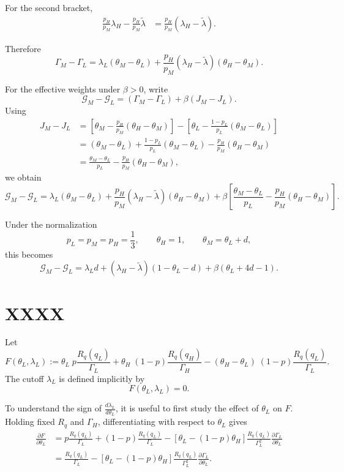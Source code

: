 \documentclass[11pt]{article}
\begin{document}
For the second bracket,
\begin{align*}
\frac{p_H}{p_M}\lambda_H-\frac{p_H}{p_M}\tilde\lambda
&=
\frac{p_H}{p_M}\left(\lambda_H-\tilde\lambda\right).
\end{align*}

Therefore
\[
\Gamma_M-\Gamma_L
=
\lambda_L\left(\theta_M-\theta_L\right)
+
\frac{p_H}{p_M}\left(\lambda_H-\tilde\lambda\right)\left(\theta_H-\theta_M\right).
\]

For the effective weights under \(\beta>0\), write
\[
\mathcal G_M-\mathcal G_L
=
\left(\Gamma_M-\Gamma_L\right)+\beta\left(J_M-J_L\right).
\]
Using
\begin{align*}
J_M-J_L
&=
\left[\theta_M-\frac{p_H}{p_M}\left(\theta_H-\theta_M\right)\right]
-
\left[\theta_L-\frac{1-p_L}{p_L}\left(\theta_M-\theta_L\right)\right] \\
&=
\left(\theta_M-\theta_L\right)
+
\frac{1-p_L}{p_L}\left(\theta_M-\theta_L\right)
-
\frac{p_H}{p_M}\left(\theta_H-\theta_M\right) \\
&=
\frac{\theta_M-\theta_L}{p_L}
-
\frac{p_H}{p_M}\left(\theta_H-\theta_M\right),
\end{align*}
we obtain
\[
\mathcal G_M-\mathcal G_L
=
\lambda_L\left(\theta_M-\theta_L\right)
+
\frac{p_H}{p_M}\left(\lambda_H-\tilde\lambda\right)\left(\theta_H-\theta_M\right)
+
\beta\left[
\frac{\theta_M-\theta_L}{p_L}
-
\frac{p_H}{p_M}\left(\theta_H-\theta_M\right)
\right].
\]

Under the normalization
\[
p_L=p_M=p_H=\frac13,\qquad \theta_H=1,\qquad \theta_M=\theta_L+d,
\]
this becomes
\[
\mathcal G_M-\mathcal G_L
=
\lambda_L d
+
\left(\lambda_H-\tilde\lambda\right)\left(1-\theta_L-d\right)
+
\beta\left(\theta_L+4d-1\right).
\]


\section{XXXX}
Let
\[
F(\theta_L,\lambda_L)
:=
\theta_L \;p\frac{R_q(q_L)}{\Gamma_L}
+ \theta_H  \; (1-p)\frac{R_q(q_H)}{\Gamma_H}
- (\theta_H-\theta_L) \; (1 - p)\frac{R_q(q_L)}{\Gamma_L}.
\]
The cutoff \(\lambda_L\) is defined implicitly by
\[
F(\theta_L,\lambda_L)=0.
\]

To understand the sign of \(\frac{d\lambda_L}{d\theta_L}\), it is useful to first study the effect of \(\theta_L\) on \(F\). Holding fixed \(R_q\) and \(\Gamma_H\), differentiating with respect to \(\theta_L\) gives
\begin{align*}
\frac{\partial F}{\partial \theta_L}
&=
p\frac{R_q(q_L)}{\Gamma_L}
+
(1-p)\frac{R_q(q_L)}{\Gamma_L}
-
\left[\theta_L-(1-p)\theta_H\right]
\frac{R_q(q_L)}{\Gamma_L^2}
\frac{\partial \Gamma_L}{\partial \theta_L} \\
&=
\frac{R_q(q_L)}{\Gamma_L}
-
\left[\theta_L-(1-p)\theta_H\right]
\frac{R_q(q_L)}{\Gamma_L^2}
\frac{\partial \Gamma_L}{\partial \theta_L}.
\end{align*}
\end{document}
